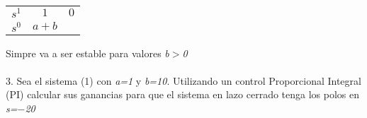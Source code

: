 \documentclass[11pt]{article}
\begin{document}
		\begin{table}[htbp]
	\centering
	\begin{tabular}{c|c c}
	$s^1$ & $1$ & $0$\\
	$s^0$ & $a+b$ &  \\
	\end{tabular}
	\end{table} 
Simpre va a ser estable para valores \emph{b$>$0}
\\
\\
3. Sea el sistema (1) con \emph{a=1} y \emph{b=10}. Utilizando un control Proporcional Integral (PI) calcular sus ganancias para que el sistema en lazo cerrado tenga los polos en \emph{s=$-$20} 
\end{document}

